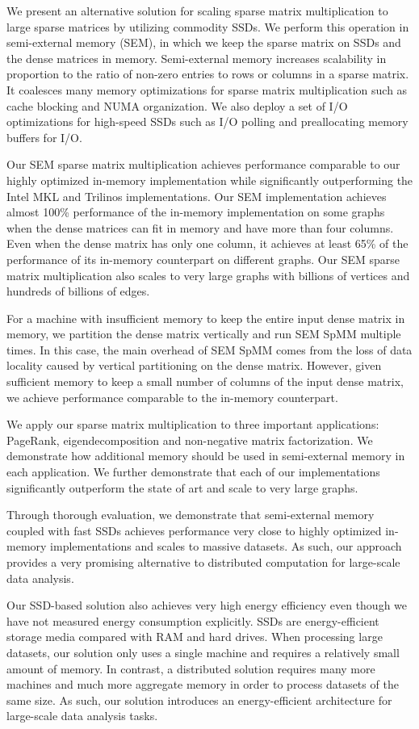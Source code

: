We present an alternative solution for scaling sparse matrix multiplication
to large sparse matrices by utilizing commodity SSDs. We perform this operation
in semi-external memory (SEM), in which
we keep the sparse matrix on SSDs and the dense matrices in memory. Semi-external
memory increases scalability in proportion to the ratio of non-zero entries
to rows or columns in a sparse matrix. It coalesces many memory
optimizations for sparse matrix multiplication such as cache blocking and NUMA
organization. We also deploy a set of I/O optimizations for high-speed SSDs
such as I/O polling and preallocating memory buffers for I/O.

Our SEM sparse matrix multiplication achieves performance comparable
to our highly optimized in-memory implementation while significantly outperforming
the Intel MKL and
Trilinos implementations. Our SEM implementation achieves almost 100\% performance
of the in-memory implementation on some graphs when the dense matrices can fit
in memory and have more than four columns. Even when the dense matrix has only
one column, it achieves at least 65\% of the performance of its in-memory counterpart
on different graphs. Our SEM sparse matrix multiplication also scales to very
large graphs with billions of vertices and hundreds of billions of edges.

For a machine with insufficient memory to keep the entire input dense matrix
in memory, we partition the dense matrix vertically and run SEM SpMM multiple
times. In this case, the main overhead of SEM SpMM comes from the loss of
data locality caused by vertical partitioning on the dense matrix. However,
given sufficient memory to keep a small number of columns of the input dense
matrix, we achieve performance comparable to the in-memory counterpart.

We apply our sparse matrix multiplication to three important applications:
PageRank, eigendecomposition and non-negative matrix factorization. We demonstrate
how additional memory should be used in semi-external memory in each application.
We further demonstrate that each of our implementations significantly outperform
the state of art and scale to very large graphs.

Through thorough evaluation, we demonstrate that semi-external memory
coupled with fast SSDs achieves performance very close to highly optimized
in-memory implementations and scales to massive datasets.
As such, our approach provides a very promising alternative to distributed
computation for large-scale data analysis.

Our SSD-based solution also achieves very high energy efficiency even though
we have not measured energy consumption explicitly. SSDs are energy-efficient
storage media \cite{Tsirogiannis} compared with RAM and hard drives.
When processing large datasets, our solution only uses
a single machine and requires a relatively small amount of memory. In contrast,
a distributed solution requires many more machines and much more aggregate
memory in order to process datasets of the same size. As such, our solution
introduces an energy-efficient architecture for large-scale data analysis tasks.
